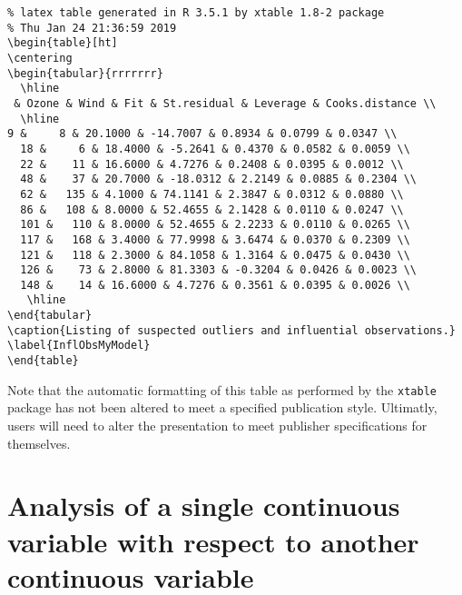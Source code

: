 \documentclass[
]{book}
\begin{document}
\begin{verbatim}
% latex table generated in R 3.5.1 by xtable 1.8-2 package
% Thu Jan 24 21:36:59 2019
\begin{table}[ht]
\centering
\begin{tabular}{rrrrrrr}
  \hline
 & Ozone & Wind & Fit & St.residual & Leverage & Cooks.distance \\ 
  \hline
9 &     8 & 20.1000 & -14.7007 & 0.8934 & 0.0799 & 0.0347 \\ 
  18 &     6 & 18.4000 & -5.2641 & 0.4370 & 0.0582 & 0.0059 \\ 
  22 &    11 & 16.6000 & 4.7276 & 0.2408 & 0.0395 & 0.0012 \\ 
  48 &    37 & 20.7000 & -18.0312 & 2.2149 & 0.0885 & 0.2304 \\ 
  62 &   135 & 4.1000 & 74.1141 & 2.3847 & 0.0312 & 0.0880 \\ 
  86 &   108 & 8.0000 & 52.4655 & 2.1428 & 0.0110 & 0.0247 \\ 
  101 &   110 & 8.0000 & 52.4655 & 2.2233 & 0.0110 & 0.0265 \\ 
  117 &   168 & 3.4000 & 77.9998 & 3.6474 & 0.0370 & 0.2309 \\ 
  121 &   118 & 2.3000 & 84.1058 & 1.3164 & 0.0475 & 0.0430 \\ 
  126 &    73 & 2.8000 & 81.3303 & -0.3204 & 0.0426 & 0.0023 \\ 
  148 &    14 & 16.6000 & 4.7276 & 0.3561 & 0.0395 & 0.0026 \\ 
   \hline
\end{tabular}
\caption{Listing of suspected outliers and influential observations.} 
\label{InflObsMyModel}
\end{table}
\end{verbatim}

Note that the automatic formatting of this table as performed by the \texttt{xtable} package has not been altered to meet a specified publication style. Ultimatly, users will need to alter the presentation to meet publisher specifications for themselves.

\hypertarget{analysis-of-a-single-continuous-variable-with-respect-to-another-continuous-variable}{%
\section{Analysis of a single continuous variable with respect to another continuous variable}\label{analysis-of-a-single-continuous-variable-with-respect-to-another-continuous-variable}}
\end{document}

